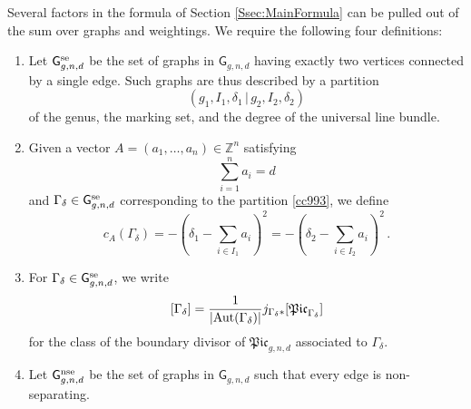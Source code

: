 \documentclass[a4paper,12pt]{article} %
\def\Aut{{\rm Aut}}
\def\G{\mathsf{G}}
\theoremstyle{definition}
\theoremstyle{plain}%
\newcommand{\Picabs}{\mathfrak{Pic}}
\begin{document}
Several factors in the formula of Section \ref{Ssec:MainFormula} can be pulled out of the sum over graphs and weightings. 
We require the following four definitions:
\begin{enumerate}
\item[$\bullet$] Let $\G_{g,n,d}^\textup{se}$ be the set of graphs in $\G_{g,n,d}$ having exactly two vertices connected by a single edge. 
Such graphs are thus described by a partition 
\begin{equation}\label{cc993}
(g_1, I_1, \delta_1\, |\,  g_2, I_2, \delta_2)
\end{equation}
of the genus, the marking set, and the degree of the universal line bundle. 
\item[$\bullet$]
Given a vector $A =(a_1,\ldots,a_n) \in \mathbb{Z}^n$ satisfying 
$$\sum_{i=1}^n a_i = d$$ and 
$\Gamma_{\delta} \in \G_{g,n,d}^\textup{se}$ corresponding to the partition \eqref{cc993}, we define
\[c_A(\Gamma_\delta) = - (\delta_1 - \sum_{i \in I_1} a_i)^2 =  -(\delta_2 - \sum_{i \in I_2} a_i)^2\, .\]
\item[$\bullet$] For $\Gamma_\delta \in \G_{g,n,d}^\textup{se}$, we write $$[\Gamma_\delta] = \frac{1}{|\Aut(\Gamma_\delta)|} j_{\Gamma_\delta*} [\Picabs_{\Gamma_{\delta}}]$$ for the class of the boundary divisor of $\Picabs_{g,n,d}$ associated to $\Gamma_\delta$. 
\item[$\bullet$]
Let $\G_{g,n,d}^\textup{nse}$ be the set of graphs in $\G_{g,n,d}$ such that every edge is non-separating. 
\end{enumerate}
\end{document}
